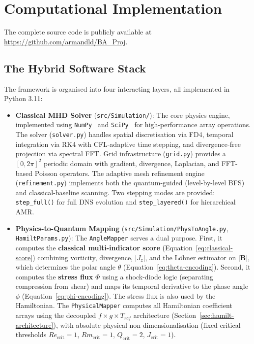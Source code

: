 \documentclass[12pt, a4paper, oneside]{report}
\begin{document}
\chapter{Computational Implementation}
\label{chap:implementation}

The complete source code is publicly available at \url{https://github.com/armandld/BA_Proj}.

\section{The Hybrid Software Stack}
The framework is organised into four interacting layers, all implemented in Python 3.11:
\begin{itemize}
    \item \textbf{Classical MHD Solver} (\texttt{src/Simulation/}): The core physics engine, implemented using \texttt{NumPy}~\cite{numpy2020} and \texttt{SciPy}~\cite{scipy2020} for high-performance array operations. The solver (\texttt{solver.py}) handles spatial discretisation via FD4, temporal integration via RK4 with CFL-adaptive time stepping, and divergence-free projection via spectral FFT. Grid infrastructure (\texttt{grid.py}) provides a $[0, 2\pi]^2$ periodic domain with gradient, divergence, Laplacian, and FFT-based Poisson operators. The adaptive mesh refinement engine (\texttt{refinement.py}) implements both the quantum-guided (level-by-level BFS) and classical-baseline scanning. Two stepping modes are provided: \texttt{step\_full()} for full DNS evolution and \texttt{step\_layered()} for hierarchical AMR.
    \item \textbf{Physics-to-Quantum Mapping} (\texttt{src/Simulation/PhysToAngle.py}, \texttt{HamiltParams.py}): The \texttt{AngleMapper} serves a dual purpose. First, it computes the \textbf{classical multi-indicator score} (Equation~\ref{eq:classical-score}) combining vorticity, divergence, $|J_z|$, and the L\"ohner estimator on $|\mathbf{B}|$, which determines the polar angle $\theta$ (Equation~\ref{eq:theta-encoding}). Second, it computes the \textbf{stress flux} $\Phi$ using a shock-diode logic (separating compression from shear) and maps its temporal derivative to the phase angle $\phi$ (Equation~\ref{eq:phi-encoding}). The stress flux is also used by the Hamiltonian. The \texttt{PhysicalMapper} computes all Hamiltonian coefficient arrays using the decoupled $f \times g \times T_{rcf}$ architecture (Section~\ref{sec:hamilt-architecture}), with absolute physical non-dimensionalisation (fixed critical thresholds $Re_{\text{crit}} = 1$, $Rm_{\text{crit}} = 1$, $Q_{\text{crit}} = 2$, $J_{\text{crit}} = 1$).

\end{itemize}
\end{document}
